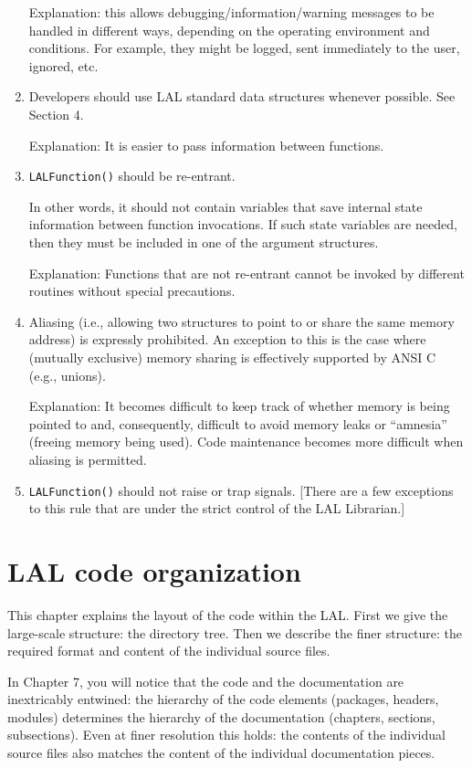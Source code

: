 \documentclass[]{ligodcc}
\begin{document}
\begin{enumerate}
Explanation: this allows debugging/information/warning messages to be
handled in different ways, depending on the operating environment and
conditions. For example, they might be logged, sent immediately to the
user, ignored, etc.


\item
Developers should use LAL standard data structures whenever
possible. See Section 4.

Explanation: It is easier to pass information between functions.

\item
{\tt LALFunction()} should be re-entrant.


In other words, it should not contain variables that save internal
state information between function invocations. If such state
variables are needed, then they must be included in one of the argument structures.

Explanation: Functions that are not re-entrant cannot be invoked by
different routines without special precautions.

\item
Aliasing (i.e., allowing two structures to point to or share
the same memory address) is expressly prohibited. An exception to this
is the case where (mutually exclusive) memory sharing is effectively
supported by ANSI C (e.g., unions).

Explanation: It becomes difficult to keep track of whether memory is
being pointed to and, consequently, difficult to avoid memory leaks
or ``amnesia''  (freeing memory being used). Code maintenance becomes
more difficult when aliasing is permitted.

\item
{\tt LALFunction()} should not raise  or trap signals.
[There are a few exceptions to this rule that are under the
strict control of the LAL Librarian.]

\end{enumerate}


\section{LAL code organization}
\label{sec:lalcode}

This chapter explains the layout of the code within the LAL. First we
give the large-scale structure: the directory tree.  Then we
describe the finer structure: the required format and content of the
individual source files.

In Chapter 7, you will notice that the code and the  documentation are
inextricably entwined: the hierarchy  of the code elements (packages,
headers, modules)  determines the hierarchy of the documentation
(chapters, sections, subsections).  Even at finer resolution this
holds:  the contents of the individual source files also matches the
content of the individual documentation pieces.
\end{document}
